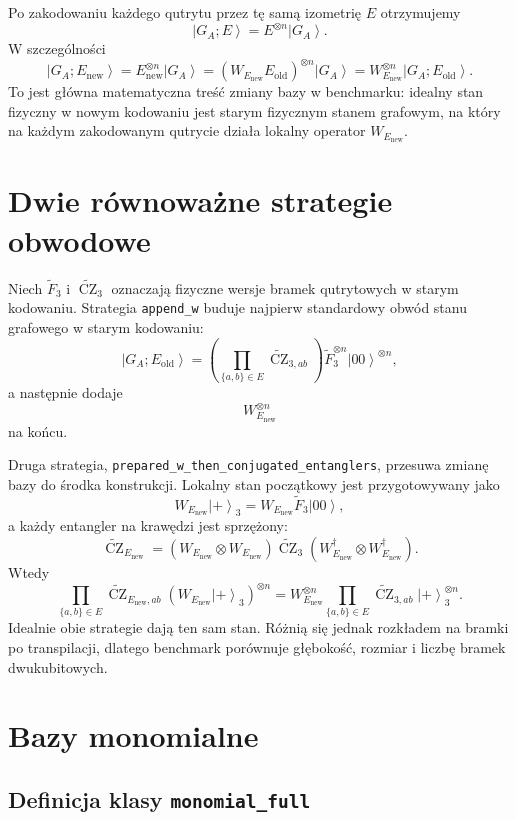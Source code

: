 \documentclass[11pt,a4paper]{article}
\newcommand{\Eold}{E_{\mathrm{old}}}
\newcommand{\Enew}{E_{\mathrm{new}}}
\newcommand{\CZ}{\operatorname{CZ}}
\newcommand{\ket}[1]{\left|#1\right\rangle}
\begin{document}
Po zakodowaniu każdego qutrytu przez tę samą izometrię \(E\) otrzymujemy
\[
    \ket{G_A;E}
    =
    E^{\otimes n}\ket{G_A}.
\]
W szczególności
\[
    \ket{G_A;\Enew}
    =
    \Enew^{\otimes n}\ket{G_A}
    =
    (W_{\Enew}\Eold)^{\otimes n}\ket{G_A}
    =
    W_{\Enew}^{\otimes n}\ket{G_A;\Eold}.
\]
To jest główna matematyczna treść zmiany bazy w benchmarku: idealny stan
fizyczny w nowym kodowaniu jest starym fizycznym stanem grafowym, na który na
każdym zakodowanym qutrycie działa lokalny operator \(W_{\Enew}\).

\section{Dwie równoważne strategie obwodowe}

Niech \(\widetilde{F}_3\) i \(\widetilde{\CZ}_3\) oznaczają fizyczne wersje
bramek qutrytowych w starym kodowaniu. Strategia \texttt{append\_w} buduje
najpierw standardowy obwód stanu grafowego w starym kodowaniu:
\[
    \ket{G_A;\Eold}
    =
    \left(\prod_{\{a,b\}\in E}\widetilde{\CZ}_{3,ab}\right)
    \widetilde{F}_3^{\otimes n}
    \ket{00}^{\otimes n},
\]
a następnie dodaje
\[
    W_{\Enew}^{\otimes n}
\]
na końcu.

Druga strategia, \texttt{prepared\_w\_then\_conjugated\_entanglers}, przesuwa
zmianę bazy do środka konstrukcji. Lokalny stan początkowy jest przygotowywany
jako
\[
    W_{\Enew}\ket{+}_3
    =
    W_{\Enew}\widetilde{F}_3\ket{00},
\]
a każdy entangler na krawędzi jest sprzężony:
\[
    \boxed{
    \widetilde{\CZ}_{\Enew}
    =
    (W_{\Enew}\otimes W_{\Enew})
    \widetilde{\CZ}_{3}
    (W_{\Enew}^\dagger\otimes W_{\Enew}^\dagger)
    }.
\]
Wtedy
\[
    \prod_{\{a,b\}\in E}
    \widetilde{\CZ}_{\Enew,ab}
    \left(W_{\Enew}\ket{+}_3\right)^{\otimes n}
    =
    W_{\Enew}^{\otimes n}
    \prod_{\{a,b\}\in E}
    \widetilde{\CZ}_{3,ab}
    \ket{+}_3^{\otimes n}.
\]
Idealnie obie strategie dają ten sam stan. Różnią się jednak rozkładem na
bramki po transpilacji, dlatego benchmark porównuje głębokość, rozmiar i liczbę
bramek dwukubitowych.

\section{Bazy monomialne}

\subsection{Definicja klasy \texttt{monomial\_full}}
\end{document}
